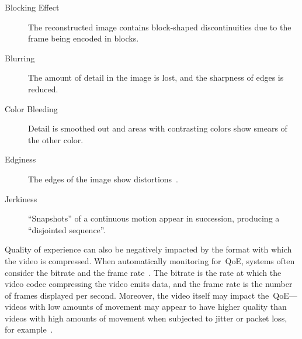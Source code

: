         \begin{description}
            \item[Blocking Effect] The reconstructed image contains block-shaped discontinuities due to the frame being encoded in blocks.
            \item[Blurring] The amount of detail in the image is lost, and the sharpness of edges is reduced.
            \item[Color Bleeding] Detail is smoothed out and areas with contrasting colors show smears of the other color.
            \item[Edginess] The edges of the image show distortions~\autocite{ChenYanjiao2015FQtQ}.
            \item[Jerkiness] \enquote{Snapshots} of a continuous motion appear in succession, producing a \enquote{disjointed sequence}.
        \end{description}

        Quality of experience can also be negatively impacted by the format with which the video is compressed. When automatically monitoring for~QoE, systems often consider the bitrate and the frame rate~\autocite{ChenYanjiao2015FQtQ}. The bitrate is the rate at which the video codec compressing the video emits data, and the frame rate is the number of frames displayed per second. Moreover, the video itself may impact the~QoE---videos with low amounts of movement may appear to have higher quality than videos with high amounts of movement when subjected to jitter or packet loss, for example~\autocite{ChenYanjiao2015FQtQ}.
